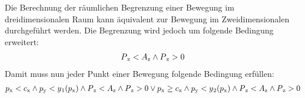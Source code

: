 		Die Berechnung der räumlichen Begrenzung einer Bewegung im dreidimensionalen Raum kann äquivalent zur Bewegung im Zweidimensionalen durchgeführt werden. Die Begrenzung wird jedoch um folgende Bedingung erweitert:
		\begin{align}
			P\textsubscript{z}<A\textsubscript{z}\land P\textsubscript{z}>0
		\end{align}
		Damit muss nun jeder Punkt einer Bewegung folgende Bedingung erfüllen:
		\begin{align}
			p\textsubscript{x}<c\textsubscript{x} 
			\land 	p\textsubscript{y}<y\textsubscript{1}(p\textsubscript{x})
			\land	P\textsubscript{z}<A\textsubscript{z}
			\land 	P\textsubscript{z}>0 
			\lor
			p\textsubscript{x} \geq c\textsubscript{x} 
			\land 	p\textsubscript{y}<y\textsubscript{2}(p\textsubscript{x})
			\land	P\textsubscript{z}<A\textsubscript{z}
			\land 	P\textsubscript{z}>0
		\end{align}
	\pagebreak